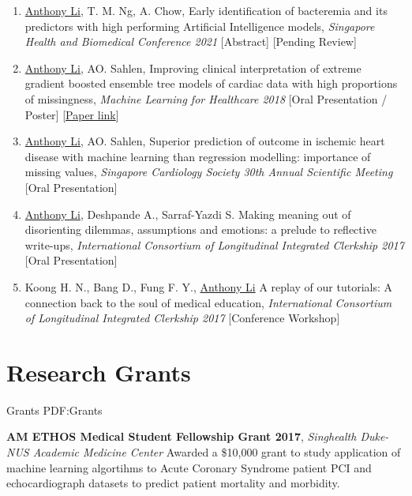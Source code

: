 \documentclass[letterpaper,10pt,oneside]{article}
\begin{document}
\begin{body}
\begin{enumerate}
\item \underline{Anthony Li}, T. M. Ng, A. Chow, \textcolor{mygray}{Early identification of bacteremia and its predictors with high performing Artificial Intelligence models}, \textit{Singapore Health and Biomedical Conference 2021} [Abstract] [Pending Review]

\item \underline{Anthony Li}, AO. Sahlen, \textcolor{mygray}{Improving clinical interpretation of extreme gradient boosted ensemble tree models of cardiac data with high proportions of missingness}, \textit{Machine Learning for Healthcare 2018} [Oral Presentation / Poster] [\href{https://static1.squarespace.com/static/59d5ac1780bd5ef9c396eda6/t/5b737a45032be4fab007b259/1534294605515/Li_A}{Paper link}]

\item \underline{Anthony Li}, AO. Sahlen, \textcolor{mygray}{Superior prediction of outcome in ischemic heart disease with machine learning than regression modelling: importance of missing values}, \textit{Singapore Cardiology Society 30th Annual Scientific Meeting}
[Oral Presentation]

\item \underline{Anthony Li}, Deshpande A., Sarraf-Yazdi S. \textcolor{mygray}{Making meaning out of disorienting dilemmas, assumptions and emotions: a prelude to reflective write-ups}, \textit{International Consortium of Longitudinal Integrated Clerkship 2017}
[Oral Presentation]

\item Koong H. N., Bang D., Fung F. Y., \underline{Anthony Li} \textcolor{mygray}{A replay of our tutorials: A connection back to the soul of medical education}, \textit{International Consortium of Longitudinal Integrated Clerkship 2017}
[Conference Workshop]

\end{enumerate}


\section
{Research Grants}
{Grants}
{PDF:Grants}

\textbf{AM ETHOS Medical Student Fellowship Grant 2017},
\hfill{}
\GapNoBreak
\textit{Singhealth Duke-NUS Academic Medicine Center}
\GapNoBreak
\BulletItem
Awarded a \$10,000 grant to study application of machine learning algortihms to Acute Coronary Syndrome patient PCI and echocardiograph datasets to predict patient mortality and morbidity.
\GapNoBreak




\end{body}
\end{document}
